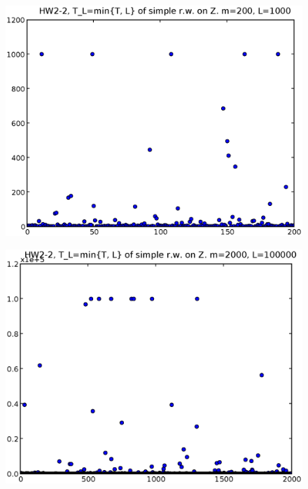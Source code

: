 \documentclass[a4paper,10pt]{article}
\begin{document}
\begin{figure}
\includegraphics[width=1\textwidth]{hw2_2_m200L1000.eps}
\caption{}
\end{figure}
\begin{figure}
\includegraphics[width=1\textwidth]{hw2_2_m2000L10000.eps}
\caption{}
\end{figure}
\end{document}
